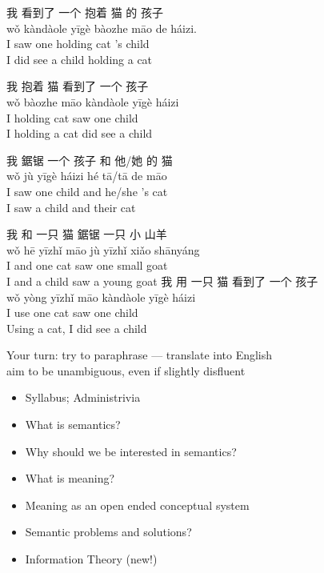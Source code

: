 \documentclass[headrule,footrule]{foils}
\begin{document}
\makexeCJKactive
\begin{exe}
  \ex \glll 我 看到了 一个 抱着 猫 的 孩子 \\
  wǒ   kàndàole    yīgè   bàozhe  māo  de    háizi. \\
  I saw one holding cat 's child \\
  \trans I did see a child holding a cat

  \ex \glll 我 抱着 猫 看到了 一个 孩子 \\
  wǒ  bàozhe māo kàndàole  yīgè     háizi \\
  I holding cat saw one  child \\
 \trans I holding a cat did see a child

  \ex \glll 我 鋸锯  一个 孩子 和 他/她 的 猫 \\
wǒ jù  yīgè    háizi  hé  tā/tā   de māo \\
 I      saw    one    child   and     he/she  's cat\\
 \trans I saw  a child and their cat 

  \ex \glll 我 和 一只 猫 鋸锯 一只 小 山羊 \\
wǒ hē  yīzhǐ  māo jù yīzhǐ xiǎo  shānyáng  \\
I and one cat saw one small goat \\

\trans I and a child saw a young goat
  \ex \glll 我 用 一只 猫 看到了 一个 孩子 \\
wǒ yòng yīzhǐ  māo kàndàole  yīgè  háizi \\
I use one cat saw one child \\
\trans Using a cat, I did see a child
\end{exe}
\makexeCJKinactive

\bigskip
\begin{center} \large
  Your turn: try to paraphrase --- translate into English
  \\ aim to be unambiguous, even if slightly disfluent
\end{center}

\begin{itemize}
\item Syllabus; Administrivia
\item What is semantics?
\item Why should we be interested in semantics?
\item What is meaning?
\item Meaning as an open ended conceptual system
\item Semantic problems and solutions?
\item Information Theory (new!)
\end{itemize}
\end{document}
